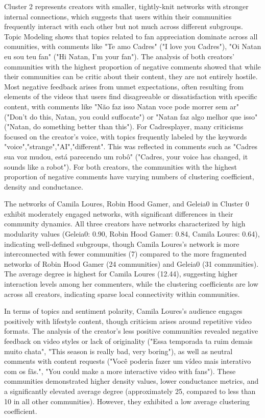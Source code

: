 \documentclass[12pt]{article}
\begin{document}
Cluster 2 represents creators with smaller, tightly-knit networks with stronger internal connections,
which suggests that users within their communities frequently interact with each other but not much across
different subgroups. Topic Modeling shows that topics related to fan appreciation dominate across 
all comunities, with comments like "Te amo Cadres" ("I love you Cadres"), "Oi Natan eu sou teu fan"
("Hi Natan, I'm your fan"). 
The analysis of both creators' communities with the highest proportion of negative comments showed that
while their communities can be critic about their content, they are not entirely hostile.
Most negative feedback arises from unmet expectations,
often resulting from elements of the videos that users find disagreeable or dissatisfaction with 
specific content,
with comments like "Não faz isso Natan voce pode morrer sem ar" ("Don't do this, Natan, you could suffocate")
or "Natan faz algo melhor que isso" ("Natan, do something better than this"). 
For Cadresplayer, many criticisms focused on the creator's voice, with topics frequently labeled by
the keywords "voice","strange","AI","different". This was reflected in comments such as "Cadres sua voz 
mudou, está parecendo um robô" ("Cadres, your voice has changed, it sounds like a robot").
For both creators, the communities with the highest proportion of negative comments have varying numbers
of clustering coefficient, density and conductance.

The networks of Camila Loures, Robin Hood Gamer, and Geleia0 in Cluster 0 exhibit 
moderately engaged networks, with significant differences in their community dynamics. 
All three creators have networks characterized by high modularity values (Geleia0: 0.90, Robin Hood Gamer: 
0.84, Camila Loures: 0.64), indicating well-defined subgroups, though Camila Loures’s network is 
more interconnected with fewer communities (7) compared to the more fragmented networks of Robin Hood Gamer 
(24 communities) and Geleia0 (31 communities). 
The average degree is highest for Camila Loures (12.44), suggesting higher 
interaction levels among her commenters, while the clustering coefficients are low across all creators, 
indicating sparse local connectivity within communities. 

In terms of topics and sentiment polarity, Camila Loures's 
audience engages positively with lifestyle content, though criticism arises around repetitive 
video formats.
The analysis of the creator's less positive communities revealed negative feedback on 
video styles or lack of originality ("Essa temporada ta ruim demais muito chata", "This season is really bad, very boring"), 
as well as neutral comments with content requests ("Você poderia fazer um vídeo mais interativo com os fãs.", 
"You could make a more interactive video with fans").
These communities demonstrated higher density values, lower conductance metrics, and a significantly 
elevated average degree (approximately 25, compared to less than 10 in all other communities). 
However, they exhibited a low average clustering coefficient.
\end{document}
